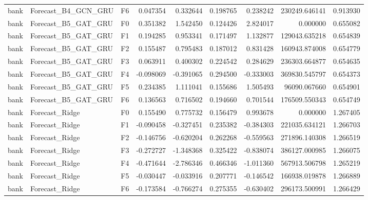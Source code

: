 \begin{tabular}{lllrrrrrr}
      bank &          Forecast\_B4\_GCN\_GRU &  F6 &  0.047354 &  0.332644 & 0.198765 &  0.238242 &    230249.646141 &             0.913930 \\
      bank &          Forecast\_B5\_GAT\_GRU &  F0 &  0.351382 &  1.542450 & 0.124426 &  2.824017 &         0.000000 &             0.655082 \\
      bank &          Forecast\_B5\_GAT\_GRU &  F1 &  0.194285 &  0.953341 & 0.171497 &  1.132877 &    129043.635218 &             0.654839 \\
      bank &          Forecast\_B5\_GAT\_GRU &  F2 &  0.155487 &  0.795483 & 0.187012 &  0.831428 &    160943.874008 &             0.654779 \\
      bank &          Forecast\_B5\_GAT\_GRU &  F3 &  0.063911 &  0.400302 & 0.224542 &  0.284629 &    236303.664877 &             0.654635 \\
      bank &          Forecast\_B5\_GAT\_GRU &  F4 & -0.098069 & -0.391065 & 0.294500 & -0.333003 &    369830.545797 &             0.654373 \\
      bank &          Forecast\_B5\_GAT\_GRU &  F5 &  0.234385 &  1.111041 & 0.155686 &  1.505493 &     96090.067660 &             0.654901 \\
      bank &          Forecast\_B5\_GAT\_GRU &  F6 &  0.136563 &  0.716502 & 0.194660 &  0.701544 &    176509.550343 &             0.654749 \\
      bank &               Forecast\_Ridge &  F0 &  0.155490 &  0.775732 & 0.156479 &  0.993678 &         0.000000 &             1.267405 \\
      bank &               Forecast\_Ridge &  F1 & -0.090458 & -0.327451 & 0.235382 & -0.384303 &    221035.634121 &             1.266703 \\
      bank &               Forecast\_Ridge &  F2 & -0.146756 & -0.620204 & 0.262268 & -0.559563 &    271896.140308 &             1.266519 \\
      bank &               Forecast\_Ridge &  F3 & -0.272727 & -1.348368 & 0.325422 & -0.838074 &    386127.000985 &             1.266075 \\
      bank &               Forecast\_Ridge &  F4 & -0.471644 & -2.786346 & 0.466346 & -1.011360 &    567913.506798 &             1.265219 \\
      bank &               Forecast\_Ridge &  F5 & -0.030447 & -0.033916 & 0.207771 & -0.146542 &    166938.019878 &             1.266889 \\
      bank &               Forecast\_Ridge &  F6 & -0.173584 & -0.766274 & 0.275355 & -0.630402 &    296173.500991 &             1.266429 \\

\end{tabular}
